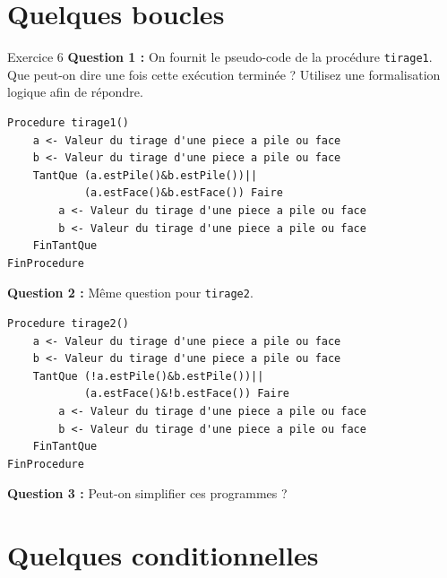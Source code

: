 \documentclass[a4paper,11pt]{article}
\begin{document}
\section{Quelques boucles}

\begin{exercisebox}{Exercice 6}
\textbf{Question 1 :} On fournit le pseudo-code de la procédure \texttt{tirage1}. Que peut-on dire une fois cette exécution terminée ? Utilisez une formalisation logique afin de répondre.

\begin{lstlisting}
Procedure tirage1()
    a <- Valeur du tirage d'une piece a pile ou face
    b <- Valeur du tirage d'une piece a pile ou face
    TantQue (a.estPile()&b.estPile())||
            (a.estFace()&b.estFace()) Faire
        a <- Valeur du tirage d'une piece a pile ou face
        b <- Valeur du tirage d'une piece a pile ou face
    FinTantQue
FinProcedure
\end{lstlisting}

\textbf{Question 2 :} Même question pour \texttt{tirage2}.

\begin{lstlisting}
Procedure tirage2()
    a <- Valeur du tirage d'une piece a pile ou face
    b <- Valeur du tirage d'une piece a pile ou face
    TantQue (!a.estPile()&b.estPile())||
            (a.estFace()&!b.estFace()) Faire
        a <- Valeur du tirage d'une piece a pile ou face
        b <- Valeur du tirage d'une piece a pile ou face
    FinTantQue
FinProcedure
\end{lstlisting}

\textbf{Question 3 :} Peut-on simplifier ces programmes ?
\end{exercisebox}

\section{Quelques conditionnelles}
\end{document}
